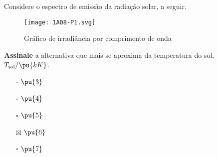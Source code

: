 Considere o espectro de emissão da radiação solar, a seguir.

\begin{figure}
\centering
\texttt{[image: 1A08-P1.svg]}
\caption{Gráfico de irradiância por comprimento de onda}
\end{figure}

\textbf{Assinale} a alternativa que mais se aproxima da temperatura do
sol, \(T_\text{sol}/\pu{kK}\).

\begin{itemize}
\tightlist
\item[$\square$]
  \(\pu{3}\)
\item[$\square$]
  \(\pu{4}\)
\item[$\square$]
  \(\pu{5}\)
\item[$\boxtimes$]
  \(\pu{6}\)
\item[$\square$]
  \(\pu{7}\)
\end{itemize}
